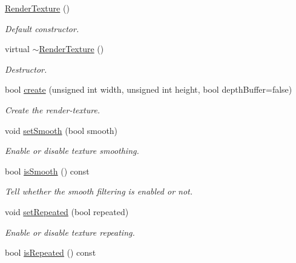 \begin{DoxyCompactItemize}
\item 
\hyperlink{classsf_1_1_render_texture_a19ee6e5b4c40ad251803389b3953a9c6}{Render\+Texture} ()
\begin{DoxyCompactList}\small\item\em Default constructor. \end{DoxyCompactList}\item 
\hypertarget{classsf_1_1_render_texture_a94b84ab9335be84d2a014c964d973304}{virtual \hyperlink{classsf_1_1_render_texture_a94b84ab9335be84d2a014c964d973304}{$\sim$\+Render\+Texture} ()}\label{classsf_1_1_render_texture_a94b84ab9335be84d2a014c964d973304}

\begin{DoxyCompactList}\small\item\em Destructor. \end{DoxyCompactList}\item 
bool \hyperlink{classsf_1_1_render_texture_aefbb76eb3b87e368ab974b2660931ccb}{create} (unsigned int width, unsigned int height, bool depth\+Buffer=false)
\begin{DoxyCompactList}\small\item\em Create the render-\/texture. \end{DoxyCompactList}\item 
void \hyperlink{classsf_1_1_render_texture_af08991e63c6020865dd07b20e27305b6}{set\+Smooth} (bool smooth)
\begin{DoxyCompactList}\small\item\em Enable or disable texture smoothing. \end{DoxyCompactList}\item 
bool \hyperlink{classsf_1_1_render_texture_ae385f4f4dbd2af50fb11947bf0bcb83d}{is\+Smooth} () const 
\begin{DoxyCompactList}\small\item\em Tell whether the smooth filtering is enabled or not. \end{DoxyCompactList}\item 
void \hyperlink{classsf_1_1_render_texture_af8f97b33512bf7d5b6be3da6f65f7365}{set\+Repeated} (bool repeated)
\begin{DoxyCompactList}\small\item\em Enable or disable texture repeating. \end{DoxyCompactList}\item 
bool \hyperlink{classsf_1_1_render_texture_ae480a2ec7ee166afa50232e634d2668c}{is\+Repeated} () const 

\end{DoxyCompactItemize}
